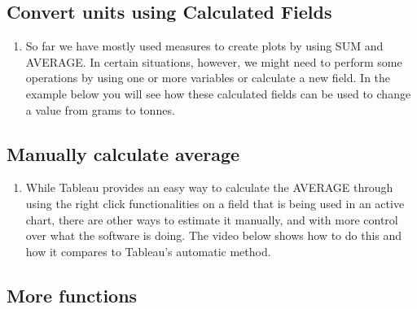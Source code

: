 \documentclass[
]{book}
\providecommand{\tightlist}{%
  \setlength{\itemsep}{0pt}\setlength{\parskip}{0pt}}
\begin{document}
\hypertarget{convert-units-using-calculated-fields}{%
\subsection{Convert units using Calculated Fields}\label{convert-units-using-calculated-fields}}

\begin{enumerate}
\def\labelenumi{\arabic{enumi}.}
\tightlist
\item
  So far we have mostly used measures to create plots by using SUM and AVERAGE. In certain situations, however, we might need to perform some operations by using one or more variables or calculate a new field. In the example below you will see how these calculated fields can be used to change a value from grams to tonnes.
\end{enumerate}

\hypertarget{manually-calculate-average}{%
\subsection{Manually calculate average}\label{manually-calculate-average}}

\begin{enumerate}
\def\labelenumi{\arabic{enumi}.}
\tightlist
\item
  While Tableau provides an easy way to calculate the AVERAGE through using the right click functionalities on a field that is being used in an active chart, there are other ways to estimate it manually, and with more control over what the software is doing. The video below shows how to do this and how it compares to Tableau's automatic method.
\end{enumerate}

\hypertarget{more-functions}{%
\subsection{More functions}\label{more-functions}}
\end{document}
